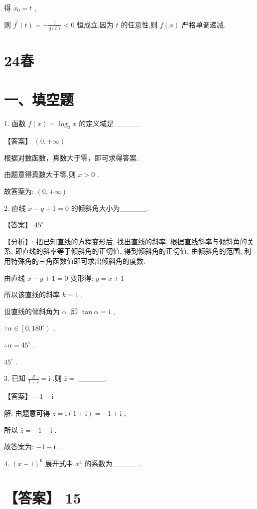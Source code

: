\documentclass[10pt]{article}
\begin{document}
得 \({x}_{0} = t\) ,

则 \({f}^{\prime }\left( t\right)  =  - \frac{1}{g\left( t\right) } < 0\) 恒成立,因为 \(t\) 的任意性,则 \(f\left( x\right)\) 严格单调递减.

\section*{24春}

\section*{一、填空题}

1. 函数 \(f\left( x\right)  = {\log }_{2}x\) 的定义域是\_\_\_\_\_

【答案】 \(\left( {0, + \infty }\right)\)

根据对数函数，真数大于零，即可求得答案.

由题意得真数大于零,则 \(x > 0\) .

故答案为: \(\left( {0, + \infty }\right)\)

2. 直线 \(x - y + 1 = 0\) 的倾斜角大小为\_\_\_\_\_.

【答案】 \({45}^{ \circ  }\)

【分析】: 把已知直线的方程变形后, 找出直线的斜率, 根据直线斜率与倾斜角的关系, 即直线的斜率等于倾斜角的正切值, 得到倾斜角的正切值, 由倾斜角的范围, 利用特殊角的三角函数值即可求出倾斜角的度数.

由直线 \(x - y + 1 = 0\) 变形得: \(y = x + 1\)

所以该直线的斜率 \(k = 1\) ,

设直线的倾斜角为 \(\alpha\) ,即 \(\tan \alpha  = 1\) ,

\(\because \alpha  \in  \left\lbrack  {0,{180}^{ \circ  }}\right)\) ,

\(\therefore \alpha  = {45}^{ \circ  }\) .

\({45}^{ \circ  }\) .

3. 已知 \(\frac{Z}{1 + i} = \mathrm{i}\) ,则 \(\bar{z} =\) \_\_\_\_\_.

【答案】 \(- 1 - \mathrm{i}\)

解: 由题意可得 \(z = \mathrm{i}\left( {1 + \mathrm{i}}\right)  =  - 1 + \mathrm{i}\) ,

所以 \(\bar{z} =  - 1 - \mathrm{i}\) .

故答案为: \(- 1 - \mathrm{i}\) .

4. \({\left( x - 1\right) }^{6}\) 展开式中 \({x}^{4}\) 的系数为\_\_\_\_\_.

\section*{【答案】 15}
\end{document}
